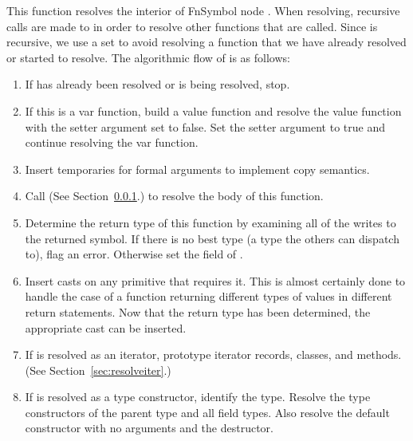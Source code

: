 \documentclass[10pt]{article}
\begin{document}
This function resolves the interior of FnSymbol node .  When
resolving, recursive calls are made to  in order to
resolve other functions that are called.  Since  is
recursive, we use a set to avoid resolving a function that we have
already resolved or started to resolve.  The algorithmic flow of
 is as follows:
\begin{enumerate}
\item If  has already been resolved or is being resolved, stop.
\item If this is a var function, build a value function and resolve
  the value function with the setter argument set to false.  Set the
  setter argument to true and continue resolving the var function.
\item Insert temporaries for formal arguments to implement copy semantics.
\item Call  (See Section~\ref{sec:resolveBlock}.) to
  resolve the body of this function.
\item Determine the return type of this function by examining all of
  the writes to the returned symbol.  If there is no best type (a type
  the others can dispatch to), flag an error.  Otherwise set the
   field of .
\item Insert casts on any  primitive that requires it.  This
  is almost certainly done to handle the case of a function returning
  different types of values in different return statements.  Now that
  the return type has been determined, the appropriate cast can be
  inserted.
\item If  is resolved as an iterator, prototype iterator
  records, classes, and methods.  (See Section~\ref{sec:resolveiter}.)
\item If  is resolved as a type constructor, identify the type.
  Resolve the type constructors of the parent type and all field
  types.  Also resolve the default constructor with no arguments and
  the destructor.
\end{enumerate}

\subsubsection{}
\label{sec:resolveBlock}
\end{document}
